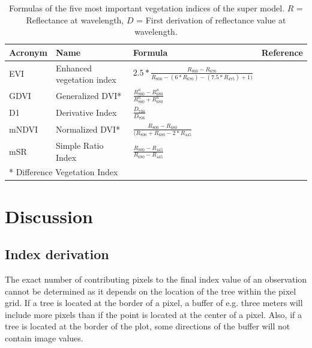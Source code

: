 \documentclass[review]{elsarticle}
\begin{document}
\begin{table}[t!]
\centering
\caption[t]{Formulas of the five most important vegetation indices of the super model. $R$ = Reflectance at wavelength, $D$ = First derivation of reflectance value at wavelength.}
\begingroup\footnotesize
\begin{tabular}{llll}
	\\
	Acronym & Name                                    & Formula                                                                 & Reference                                   \\
	\hline
	EVI     & Enhanced vegetation index               & $2.5*\frac{R_{800}-R_{670}}{R_{800}-(6*R_{670})-(7.5*R_{475})+1)}$        & \cite{hueteComparisonVegetationIndices1997}                                       \\
	GDVI    & Generalized DVI* & $\frac{R_{800}^n-R_{680}^n}{R_{800}^n+R_{680}^n}$                       & \cite{wuEstimatingChlorophyllContent2008}  \\
	D1      &         Derivative Index                                & $\frac{D_{730}}{D_{706}}$                                                       & \cite{zarco-tejadaSteadystateChlorophyllFluorescence2003} \\
	mNDVI   & Normalized DVI*  & $  \frac{R_{800}-R_{680}}{(R_{800}+R_{680}-2*R_{445}}$                       & \cite{simsRelationshipsLeafPigment2002}    \\
	mSR     & Simple Ratio Index                      & $\frac{R_{800}-R_{445}}{R_{680}-R_{445}}$                                   & \cite{simsRelationshipsLeafPigment2002}    \\
	\bottomrule
	\multicolumn{2}{l}{\small{* Difference Vegetation Index}}
\end{tabular}
\endgroup
\label{tab:supermodel_performance}
\end{table}


\section{Discussion}

\subsection{Index derivation}

The exact number of contributing pixels to the final index value of an observation cannot be determined as it depends on the location of the tree within the pixel grid.
If a tree is located at the border of a pixel, a buffer of e.g. three meters will include more pixels than if the point is located at the center of a pixel.
Also, if a tree is located at the border of the plot, some directions of the buffer will not contain image values.
\end{document}
